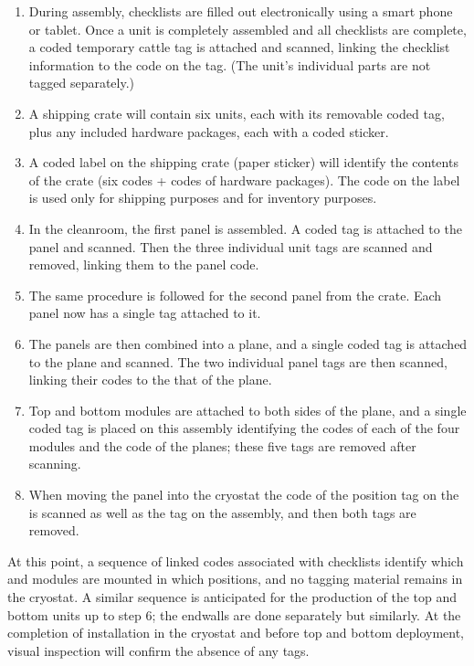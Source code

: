 \begin{enumerate}
\item During assembly,  checklists are filled out electronically using a smart phone or tablet.  Once a  unit 
is completely assembled and all checklists are complete, a coded temporary cattle tag is attached and scanned, linking the checklist information to the code on the tag. (The  unit's individual parts are not tagged separately.)
\item 
A shipping crate will contain six %
 units, each with its removable coded tag, plus any included hardware packages, each with a coded sticker.
\item A coded label on the shipping crate (paper sticker) will %
identify the contents of the crate (six codes + codes of hardware packages). The code on the label is used only for shipping purposes and for inventory purposes.  %
\item In the  cleanroom, the first  panel is assembled. A coded tag is attached to the  panel and scanned.  Then the three individual  unit tags are scanned and removed, linking them to the  panel code.
\item The same procedure is followed for the second  panel from the crate.  Each  panel now has a single tag attached to it.
\item The %
 panels are then combined into a  plane, and a single coded tag is attached to the  plane and scanned. %
The two individual  panel tags are then scanned, linking their codes to the that of the  plane. %
\item Top and bottom  modules 
are attached to both sides of the  plane, and  a single coded tag is placed on this  assembly identifying the codes of each of the four  modules %
and the code of the  planes;  %
these five tags are removed after scanning.  
\item When moving the panel into the cryostat the code of the position tag on the  is scanned as well as the tag on the  assembly, and then both tags %
are removed.
\end{enumerate}
At this point, %
a sequence of linked codes associated with  checklists %
identify which  and  modules %
are mounted in %
which  positions, and no tagging material remains in the cryostat.  A similar sequence is anticipated for the production of the top and bottom  units up to step 6; the endwalls are done separately but similarly.  
At the completion of installation in the cryostat and before top and bottom  deployment, visual inspection will confirm the absence of any tags.

